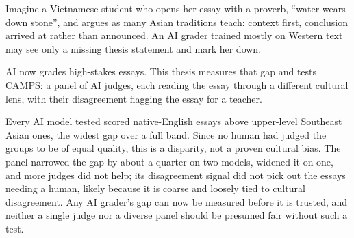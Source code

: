 
Imagine a Vietnamese student who opens her essay with a proverb,
``water wears down stone'', and argues as many Asian traditions
teach: context first, conclusion arrived at rather than announced.
An AI grader trained mostly on Western text may see only a missing
thesis statement and mark her down.

AI now grades high-stakes essays. This thesis measures that gap
and tests CAMPS: a panel of AI judges, each reading the essay
through a different cultural lens, with their disagreement
flagging the essay for a teacher.

Every AI model tested scored native-English essays above upper-level
Southeast Asian ones, the widest gap over a full band. Since no
human had judged the groups to be of equal quality, this is a
disparity, not a proven cultural bias. The panel narrowed the gap by
about a quarter on two models, widened it on one, and more judges
did not help; its disagreement signal did not pick out the essays
needing a human, likely because it is coarse and loosely tied to
cultural disagreement. Any AI grader's gap can now be measured
before it is trusted, and neither a single judge nor a diverse panel
should be presumed fair without such a test.
